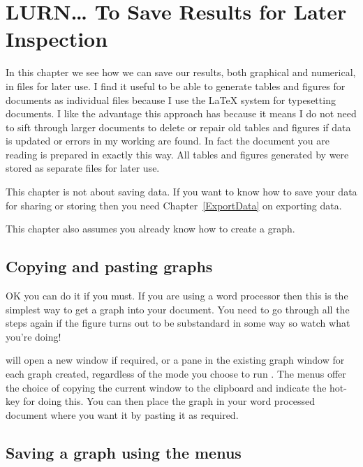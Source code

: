 



 
\chapter{LURN\ldots{} To Save Results for Later Inspection} 
\label{StoreResults} 
 



 
In this chapter we see how we can save our results, both graphical and numerical, in files for later use. I find it useful to be able to generate tables and figures for documents as individual files because I use the \LaTeX{} system for typesetting documents. I like the advantage this approach has because it means I do not need to sift through larger documents to delete or repair old tables and figures if data is updated or errors in my working are found. In fact the document you are reading is prepared in exactly this way. All tables and figures generated by \R{} were stored as separate files for later use. 
 
This chapter is not about saving data. If you want to know how to save your data for sharing or storing then you need Chapter~\ref{ExportData} on exporting data. 
 
This chapter also assumes you already know how to create a graph. 
 
\section{Copying and pasting graphs} 
 
OK you can do it if you must. If you are using a word processor then this is the simplest way to get a graph into your document. You need to go through all the steps again if the figure turns out to be substandard in some way so watch what you're doing! 
 
\R{} will open a new window if required, or a pane in the existing graph window for each graph created, regardless of the mode you choose to run \R{}. The menus offer the choice of copying the current window to the clipboard and indicate the hot-key for doing this. You can then place the graph in your word processed document where you want it by pasting it as required. 
 
\section{Saving a graph using the menus} 
 
